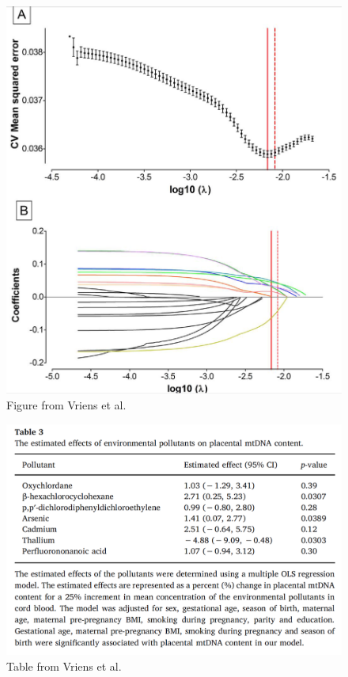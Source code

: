 \documentclass[
]{book}
\begin{document}
\begin{figure}
\centering
\includegraphics{images/resgraph.png}
\caption{Figure from Vriens et al.}
\end{figure}

\begin{figure}
\centering
\includegraphics{images/restab.png}
\caption{Table from Vriens et al.}
\end{figure}
\end{document}
